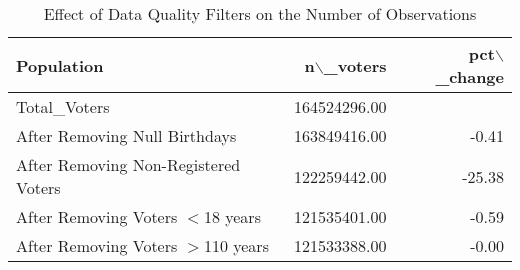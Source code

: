 \begin{table}[!htb]
\centering
\caption{Effect of Data Quality Filters on the Number of Observations} 
\label{table:filter}
\begingroup\small
\begin{tabular}{lrr}
  \hline
Population & n$\backslash$\_voters & pct$\backslash$\_change \\ 
  \hline
Total\_Voters & 164524296.00 &  \\ 
  After Removing Null Birthdays & 163849416.00 & -0.41 \\ 
  After Removing Non-Registered Voters & 122259442.00 & -25.38 \\ 
  After Removing Voters $<$18 years & 121535401.00 & -0.59 \\ 
  After Removing Voters $>$110 years & 121533388.00 & -0.00 \\ 
   \hline
\end{tabular}
\endgroup
\end{table}
